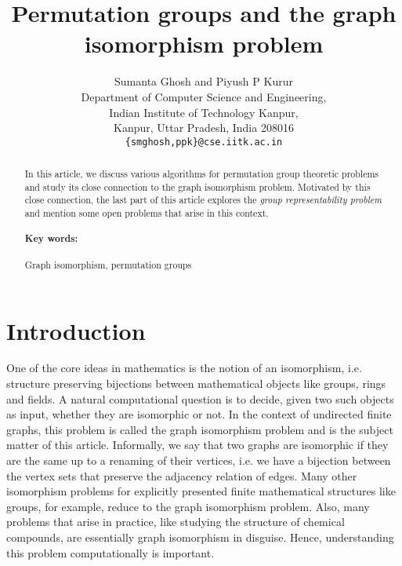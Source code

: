 \documentclass{article}
\title{Permutation groups and the graph isomorphism problem}
\author{Sumanta Ghosh and Piyush P Kurur\\
  Department of Computer Science and Engineering,\\
  Indian Institute of Technology Kanpur,\\
  Kanpur, Uttar Pradesh, India 208016\\
  {\tt \{smghosh,ppk\}@cse.iitk.ac.in}
}
\begin{document}
\maketitle
\begin{abstract}
  In this article, we discuss various algorithms for permutation group
  theoretic problems and study its close connection to the graph
  isomorphism problem. Motivated by this close connection, the last
  part of this article explores the \emph{group representability
    problem} and mention some open problems that arise in this
  context.

  \paragraph{Key words:} Graph isomorphism, permutation groups
\end{abstract}
\section{Introduction}

One of the core ideas in mathematics is the notion of an isomorphism,
i.e. structure preserving bijections between mathematical objects like
groups, rings and fields. A natural computational question is to
decide, given two such objects as input, whether they are isomorphic
or not. In the context of undirected finite graphs, this problem is
called the graph isomorphism problem and is the subject matter of this
article. Informally, we say that two graphs are isomorphic if they are
the same up to a renaming of their vertices, i.e. we have a bijection
between the vertex sets that preserve the adjacency relation of
edges. Many other isomorphism problems for explicitly presented finite
mathematical structures like groups, for example, reduce to the graph
isomorphism problem. Also, many problems that arise in practice, like
studying the structure of chemical compounds, are essentially graph
isomorphism in disguise. Hence, understanding this problem
computationally is important.
\end{document}
